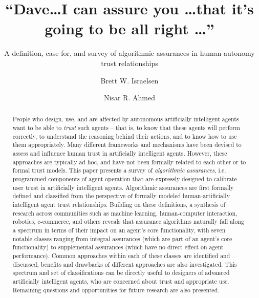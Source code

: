 \documentclass[format=manuscript, screen,review=true]{acmart}
\begin{document}
\title{``Dave\ldots I can assure you \ldots that it's going to be all right \ldots''} 
\subtitle{A definition, case for, and survey of algorithmic assurances in human-autonomy trust relationships}
\author{Brett W. Israelsen}
\author{Nisar R. Ahmed}

\begin{abstract}
    People who design, use, and are affected by autonomous artificially intelligent agents want to be able to \emph{trust} such agents -- that is, to know that these agents will perform correctly, to understand the reasoning behind their actions, and to know how to use them appropriately.  %
    Many different frameworks and mechanisms have been devised to assess and influence human trust in artificially intelligent agents. However, these approaches are typically ad hoc, and have not been formally related to each other or to formal trust models. This paper presents a survey of \emph{algorithmic assurances}, i.e. programmed components of agent operation that are expressly designed to calibrate user trust in artificially intelligent agents. %
    Algorithmic assurances are first formally defined and classified from the perspective of formally modeled human-artificially intelligent agent trust relationships. Building on these definitions, a synthesis of research across communities such as machine learning, human-computer interaction, robotics, e-commerce, and others reveals that assurance algorithms naturally fall along a spectrum in terms of their impact on an agent's core functionality, with seven notable classes ranging from integral assurances (which are part of an agent's core functionality) to supplemental assurances (which have no direct effect on agent performance). Common approaches within each of these classes are identified and discussed; benefits and drawbacks of different approaches are also investigated. This spectrum and set of classifications can be directly useful to designers of advanced artificially intelligent agents, who are concerned about trust and appropriate use. Remaining questions and opportunities for future research are also presented.
\end{abstract}
\end{document}
